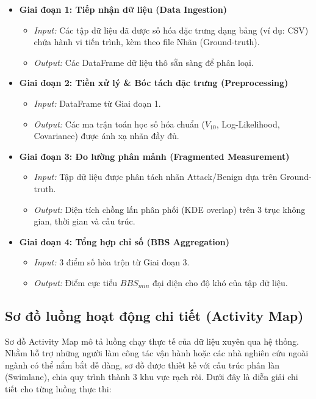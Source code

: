 \documentclass[../main.tex]{subfiles}
\begin{document}
\begin{itemize}
    \item \textbf{Giai đoạn 1: Tiếp nhận dữ liệu (Data Ingestion)}
    \begin{itemize}
        \item \textit{Input:} Các tập dữ liệu đã được số hóa đặc trưng dạng bảng (ví dụ: CSV) chứa hành vi tiến trình, kèm theo file Nhãn (Ground-truth).
        \item \textit{Output:} Các DataFrame dữ liệu thô sẵn sàng để phân loại.
    \end{itemize}
    \item \textbf{Giai đoạn 2: Tiền xử lý \& Bóc tách đặc trưng (Preprocessing)}
    \begin{itemize}
        \item \textit{Input:} DataFrame từ Giai đoạn 1.
        \item \textit{Output:} Các ma trận toán học số hóa chuẩn ($V_{10}$, Log-Likelihood, Covariance) được ánh xạ nhãn đầy đủ.
    \end{itemize}
    \item \textbf{Giai đoạn 3: Đo lường phân mảnh (Fragmented Measurement)}
    \begin{itemize}
        \item \textit{Input:} Tập dữ liệu được phân tách nhãn Attack/Benign dựa trên Ground-truth.
        \item \textit{Output:} Diện tích chồng lấn phân phối (KDE overlap) trên 3 trục không gian, thời gian và cấu trúc.
    \end{itemize}
    \item \textbf{Giai đoạn 4: Tổng hợp chỉ số (BBS Aggregation)}
    \begin{itemize}
        \item \textit{Input:} 3 điểm số hòa trộn từ Giai đoạn 3.
        \item \textit{Output:} Điểm cực tiểu $BBS_{min}$ đại diện cho độ khó của tập dữ liệu.
    \end{itemize}
\end{itemize}

\subsection{Sơ đồ luồng hoạt động chi tiết (Activity Map)}
Sơ đồ Activity Map mô tả luồng chạy thực tế của dữ liệu xuyên qua hệ thống. Nhằm hỗ trợ những người làm công tác vận hành hoặc các nhà nghiên cứu ngoài ngành có thể nắm bắt dễ dàng, sơ đồ được thiết kế với cấu trúc phân làn (Swimlane), chia quy trình thành 3 khu vực rạch ròi. Dưới đây là diễn giải chi tiết cho từng luồng thực thi:
\end{document}
